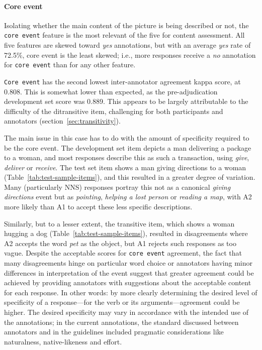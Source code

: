 \documentclass[11pt,a4paper]{article}
\newcommand{\feat}[1]{\texttt{#1}}
\newcommand{\md}[1]{\marginpar{\scriptsize MD: #1}}
\newcommand{\lk}[1]{\marginpar{\scriptsize LK: #1}}
\renewcommand{\marginpar}[1]{}
\begin{document}
\paragraph{Core event} Isolating whether the main content of the picture is being described or not, the \feat{core event} feature is the most relevant of the five for content assessment. All five features are skewed toward \textit{yes} annotations, but with an average \textit{yes} rate of 72.5\%, core event is the least skewed; i.e., more responses receive a \textit{no} annotation for \feat{core event} than for any other feature.

\feat{Core event} has the second lowest inter-annotator agreement kappa score, at 0.808. This is somewhat lower than expected, as the pre-adjudication development set score was 0.889. This appears to be largely attributable to the difficulty of the ditransitive item, challenging for both participants and annotators (section~\ref{sec:transitivity}). 

The main issue in this case has to do with the amount of specificity required to be the core event.  The development set item depicts a man delivering a package to a woman, and most responses describe this as such a transaction, using \textit{give}, \textit{deliver} or \textit{receive}. The test set item shows a man giving directions to a woman (Table~\ref{tab:test-sample-items}), and this resulted in a greater degree of variation. Many  (particularly NNS) responses portray this not as a canonical \textit{giving directions} event but as \textit{pointing}, 
\textit{helping a lost person} or \textit{reading a map}, with A2 more likely than A1 to accept these less specific descriptions.

Similarly, but to a lesser extent, the transitive item, which shows a woman hugging a dog (Table~\ref{tab:test-sample-items}), resulted in disagreements where A2 accepts the word \textit{pet} as the object, but A1 rejects such responses as too vague. Despite the acceptable scores for \feat{core event} agreement, the fact that many disagreements hinge on particular word choice or annotators having minor differences in interpretation of the event suggest that greater agreement could be achieved by providing annotators with suggestions about the acceptable content for each response. In other words: by more clearly determining the desired level of specificity of a response---for the verb or its arguments---agreement could be higher. The desired specificity may vary in accordance with the intended use of the annotations; in the current annotations, the standard discussed between annotators and in the guidelines included pragmatic considerations like naturalness, native-likeness and effort.
\end{document}
